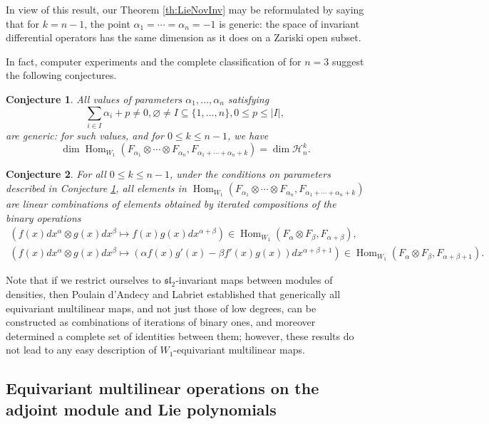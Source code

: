 \documentclass[11pt,reqno]{amsart}
\theoremstyle{plain}
\newtheorem{conjecture}{Conjecture}
\theoremstyle{definition}
\theoremstyle{remark}
\DeclareMathOperator{\Hom}{Hom}
\begin{document}
In view of this result, our Theorem \ref{th:LieNovInv} may be reformulated by saying that for $k=n-1$, the point $\alpha_1=\cdots=\alpha_n=-1$ is generic: the space of invariant differential operators has the same dimension as it does on a Zariski open subset. 

In fact, computer experiments and the complete classification of \cite{MR2547399} for $n=3$ suggest the following conjectures.

\begin{conjecture}\label{conj:singular values}
All values of parameters $\alpha_1,\ldots,\alpha_n$ satisfying
 \[
\sum_{i\in I} \alpha_{i} + p\ne 0,   \varnothing\ne I\subseteq\{1,\ldots,n\}, 0\le p\le |I|, 
 \]
are generic: for such values, and for $0\le k\le n-1$, we have 
 \[
\dim \Hom_{W_1}(F_{\alpha_1}\otimes\cdots\otimes F_{\alpha_n},F_{\alpha_1+\cdots+\alpha_n+k})=\dim\mathcal{H}_n^k. 
 \]
\end{conjecture}

\begin{conjecture}\label{conj:binarygeneration}
For all $0\le k\le n-1$, under the conditions on parameters described in Conjecture \ref{conj:singular values}, all elements in $\Hom_{W_1}(F_{\alpha_1}\otimes\cdots\otimes F_{\alpha_n},F_{\alpha_1+\cdots+\alpha_n+k})$ are linear combinations of elements obtained by iterated compositions of the binary operations
\begin{gather}
(f(x)dx^\alpha\otimes g(x)dx^{\beta}\mapsto f(x)g(x)dx^{\alpha+\beta})\in \Hom_{W_1}(F_{\alpha}\otimes F_{\beta},F_{\alpha+\beta}),\\
(f(x)dx^\alpha\otimes g(x)dx^{\beta}\mapsto (\alpha f(x)g'(x)-\beta f'(x)g(x))dx^{\alpha+\beta+1})\in \Hom_{W_1}(F_{\alpha}\otimes F_{\beta},F_{\alpha+\beta+1}).
\end{gather}
\end{conjecture}

Note that if we restrict ourselves to $\mathfrak{sl}_2$-invariant maps between modules of densities, then Poulain d'Andecy and Labriet \cite{MR4691919} established that generically all equivariant multilinear maps, and not just those of low degrees, can be constructed as combinations of iterations of binary ones, and moreover determined a complete set of identities between them; however, these results do not lead to any easy description of $W_1$-equivariant multilinear maps. 

\subsection{Equivariant multilinear operations on the adjoint module and Lie polynomials}
\end{document}
